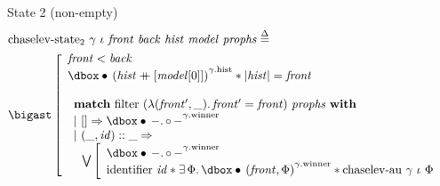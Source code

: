 \begin{frame}{State 2 (non-empty)}
\small
\begin{align*}
		&\mathrm{chaselev \mathhyphen state_2}\ \gamma\ \iota\ \mathit{front}\ \mathit{back}\ \mathit{hist}\ \mathit{model}\ \mathit{prophs}
		\eqdef
	\\
		&\iBigsep\left[\begin{array}{l}
				\mathit{front} < \mathit{back}
			\\
				\iGhost{\gamma\mathrm{.hist}}{\iAuth{(\mathit{hist} \mdoubleplus [\mathit{model} [0]])}} \iSep
				| \mathit{hist} | = \mathit{front}
			\\\\
				\begin{array}{l}
						\bold{match}\ \mathrm{filter}\ (\lambda (\mathit{front'}, \_) \ldotp \mathit{front'} = \mathit{front})\ \mathit{prophs}\ \bold{with}
					\\
						|\ [] \Rightarrow
						\iGhost{\gamma\mathrm{.winner}}{\iAuth{-} \ldotp \iFrag{-}}
					\\
						|\ (\_, \mathit{id}) :: \_ \Rightarrow
					\\
						\ \ 
						\bigvee\left[\begin{array}{l}
								\iGhost{\gamma\mathrm{.winner}}{\iAuth{-} \ldotp \iFrag{-}}
							\\
								\mathrm{identifier}\ \mathit{id} \iSep
								\exists \Phi \ldotp
								\iGhost{\gamma\mathrm{.winner}}{\iAuth{(\mathit{front}, \Phi)}} \iSep
								\mathrm{chaselev \mathhyphen au}\ \gamma\ \iota\ \Phi
						\end{array}\right.
				\end{array}
		\end{array}\right.
\end{align*}
\end{frame}


